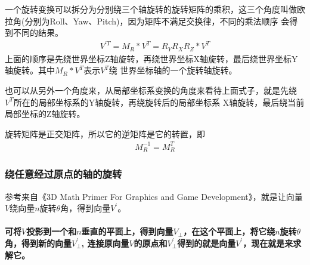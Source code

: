\par
一个旋转变换可以拆分为分别绕三个轴旋转的旋转矩阵的乘积，这三个角度叫做欧拉角(分别为Roll、Yaw、Pitch)，因为矩阵不满足交换律，不同的乘法顺序
会得到不同的结果。
\begin{gather*}
    V^{'T} = M_{R} \ast V^{T} = R_{Y}R_{X}R_{Z} \ast V^{T}
\end{gather*}
上面的顺序是先绕世界坐标Z轴旋转，再绕世界坐标X轴旋转，最后绕世界坐标Y轴旋转。其中$M_{R} \ast V^{T}$表示$V^{T}$绕
世界坐标轴的一个旋转轴旋转。
\par 
也可以从另外一个角度来，从局部坐标系变换的角度来看待上面式子，就是先绕$V^{T}$所在的局部坐标系的Y轴旋转，再绕旋转后的局部坐标系
X轴旋转，最后绕当前局部坐标的Z轴旋转。
\par 
旋转矩阵是正交矩阵，所以它的逆矩阵是它的转置，即
\begin{gather*}
    M_{R}^{-1} = M_{R}^{T}
\end{gather*}

\subsubsection{绕任意经过原点的轴的旋转}

参考来自《3D Math Primer For Graphics and Game Development》，就是让向量$V$绕向量$n$旋转$\theta$角，得到向量$V^{'}$。

\paragraph{可将$V$投影到一个和$n$垂直的平面上，得到向量$V_{\perp}$，在这个平面上，将它绕$n$旋转$\theta$角，得到新的向量$V_{\perp}^{'}$,
连接原向量$V$的原点和$V_{\perp}^{'}$得到的就是向量$V^{'}$，现在就是来求解它。}

